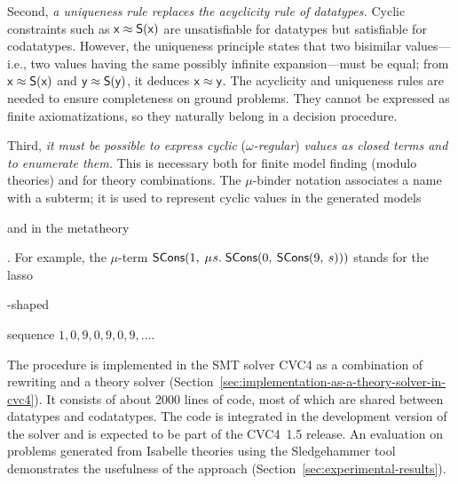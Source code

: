 Second, \emph{a uniqueness rule replaces the acyclicity rule of datatypes.}
Cyclic constraints such as
$\textsf{x} \approx \textsf{S}(\textsf{x})$ %
are unsatisfiable for datatypes but satisfiable for codatatypes.
However, the uniqueness principle states that two bisimilar values---i.e., two values
having the same possibly infinite expansion---must be equal; from $\textsf{x}
\approx \textsf{S}(\textsf{x})$ and
$\textsf{y} \approx \textsf{S}(\textsf{y})$, it deduces $\textsf{x} \approx \textsf{y}$.
The acyclicity and uniqueness rules are needed to ensure completeness on
ground problems. %
They cannot be expressed as finite axiomatizations, so they naturally belong in
a decision procedure.

Third, \emph{it must be possible to express cyclic }(\emph{$\omega$-regular}) \emph{values as closed terms and
to enumerate them.} This is necessary both for finite model finding (modulo theories)
and for theory combinations. The $\mu$-binder notation associates a name with
a subterm; it is used to represent cyclic values in the generated
models\begin{rep} and in the metatheory\end{rep}. For example,
the $\mu$-term $\const{SCons}(1,\: \MU s.\; \const{SCons}(0,\: \const{SCons}(9,\: s)))$
stands for the lasso\begin{rep}-shaped\end{rep} sequence $1, 0, 9, 0, 9, 0, 9,
\ldots$\afterLdots.


The procedure is implemented in the SMT solver CVC4 \cite{barrett-et-al-2011} as a combination
of rewriting and a theory solver (Section~\ref{sec:implementation-as-a-theory-solver-in-cvc4}).
It consists of about 2000 lines of \cpp{} code, %
most of which are shared between datatypes and codatatypes. The code is
integrated in the development version of the solver and is expected to be part
of the CVC4~1.5 release.
%
An evaluation on %
problems generated from Isabelle \cite{nipkow-et-al-2002} theories using the Sledgehammer tool \cite{paulson-blanchette-2010}
demonstrates the usefulness of the approach (Section~\ref{sec:experimental-results}).

